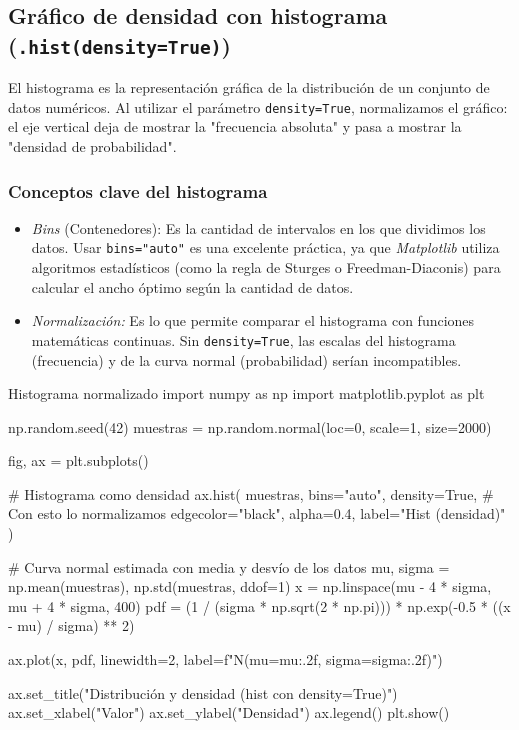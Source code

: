 \subsection{Gráfico de densidad con histograma (\texttt{.hist(density=True)})}

El histograma es la representación gráfica de la distribución de un conjunto de datos numéricos. Al utilizar el parámetro \texttt{density=True}, normalizamos el gráfico: el eje vertical deja de mostrar la "frecuencia absoluta" y pasa a mostrar la "densidad de probabilidad".

\subsubsection{Conceptos clave del histograma}

\begin{itemize}
\item \textit{Bins} (Contenedores): Es la cantidad de intervalos en los que dividimos los datos. Usar \texttt{bins="auto"} es una excelente práctica, ya que \textit{Matplotlib} utiliza algoritmos estadísticos (como la regla de Sturges o Freedman-Diaconis) para calcular el ancho óptimo según la cantidad de datos.
\item \textit{Normalización:} Es lo que permite comparar el histograma con funciones matemáticas continuas. Sin \texttt{density=True}, las escalas del histograma (frecuencia) y de la curva normal (probabilidad) serían incompatibles.
\end{itemize}

\begin{pycode}{Histograma normalizado}
import numpy as np
import matplotlib.pyplot as plt

np.random.seed(42)
muestras = np.random.normal(loc=0, scale=1, size=2000)\

fig, ax = plt.subplots()

# Histograma como densidad
ax.hist(
    muestras,
    bins="auto",
    density=True, # Con esto lo normalizamos
    edgecolor="black",
    alpha=0.4,
    label="Hist (densidad)"
)

# Curva normal estimada con media y desvío de los datos
mu, sigma = np.mean(muestras), np.std(muestras, ddof=1)
x = np.linspace(mu - 4 * sigma, mu + 4 * sigma, 400)
pdf = (1 / (sigma * np.sqrt(2 * np.pi))) * np.exp(-0.5 * ((x - mu) / sigma) ** 2)

ax.plot(x, pdf, linewidth=2, label=f"N(mu={mu:.2f}, sigma={sigma:.2f})")

ax.set_title("Distribución y densidad (hist con density=True)")
ax.set_xlabel("Valor")
ax.set_ylabel("Densidad")
ax.legend()
plt.show()
\end{pycode}

